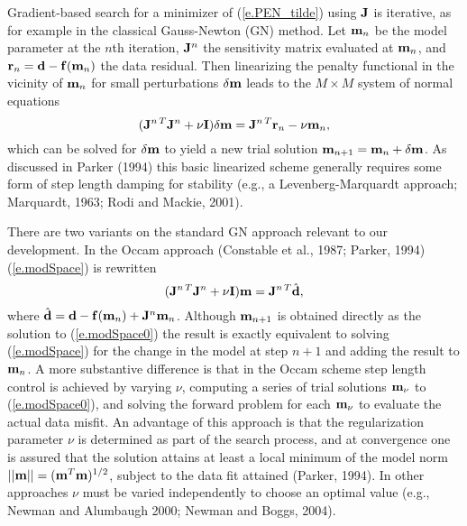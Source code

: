 Gradient-based search for a minimizer of
(\ref{e.PEN_tilde}) using ${\bf J}$ is iterative, as for example
in the classical Gauss-Newton (GN) method.  
Let ${\bf m}_n$ be the model parameter
at the $n$th iteration, 
${\bf J}^n$ the sensitivity matrix evaluated at ${\bf m}_n$, 
and ${\bf r}_n = {\bf d} - {\bf f}({\bf m}_n)$ the data residual.  Then
linearizing the penalty functional in the vicinity of ${\bf m}_n$ for
small perturbations $\delta {\bf m}$ leads to the $M \times M$ system
of normal equations
\begin{equation}
\label{e.modSpace}
({\bf J}^{n\,T} {\bf J}^n + \nu {\bf I})\delta {\bf m} = {\bf J}^{n\,T} {\bf r}_n - \nu {\bf m}_n ,
\end{equation}
which can be solved for $\delta {\bf m}$
to yield a new trial solution  ${\bf m}_{n+1} = {\bf m}_n + \delta {\bf m}$.
As discussed in Parker (1994) this basic linearized scheme generally
requires some form of step length damping for stability
(e.g., a Levenberg-Marquardt approach; Marquardt, 1963;
Rodi and Mackie, 2001).

There are two variants on the standard GN approach relevant
to our development.
In the Occam approach (Constable et al., 1987; Parker, 1994)
(\ref{e.modSpace}) is rewritten
\begin{equation}
\label{e.modSpace0}
({\bf J}^{n\,T} {\bf J}^n + \nu{\bf I} ){\bf m}  = {\bf J}^{n\,T} \hat{\bf d}  ,
\end{equation}
where $\hat{\bf d} = {\bf d} - {\bf f}({\bf m}_n) + {\bf J}^n {\bf m}_n$.
Although ${\bf m}_{n+1}$ is obtained directly
as the solution to (\ref{e.modSpace0})
the result is exactly equivalent to solving (\ref{e.modSpace})
for the change in the model at step $n+1$ and adding the result to ${\bf m}_n$.
A more substantive difference is that
in the Occam scheme step length control is achieved
by varying $\nu$, computing a series of
trial solutions ${\bf m}_{\nu}$ to (\ref{e.modSpace0}), and solving the 
forward problem for each ${\bf m}_{\nu}$
to evaluate the actual data misfit.  
An advantage of this approach is that 
the regularization parameter $\nu$ is determined
as part of the search process, and at convergence one is assured
that the solution attains at least a local minimum of the
model norm $ || {\bf m} || = ({\bf m}^T {\bf m} )^{1/2}$, subject to the data
fit attained (Parker, 1994).
In other approaches $\nu$
must be varied independently to choose an optimal value
(e.g., Newman and Alumbaugh 2000; Newman and Boggs, 2004).

